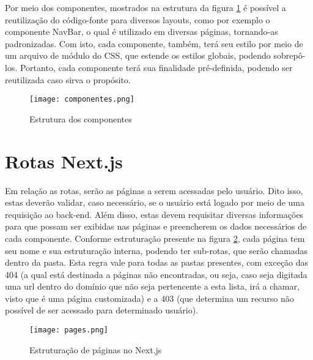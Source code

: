Por meio dos componentes, mostrados na estrutura da figura \ref{componentes} é possível a reutilização do código-fonte para diversos layouts, como por exemplo o componente NavBar, o qual é utilizado em diversas páginas, tornando-as padronizadas. Com isto, cada componente, também, terá seu estilo por meio de um arquivo de módulo do CSS, que estende os estilos globais, podendo sobrepô-los. Portanto, cada componente terá sua finalidade pré-definida, podendo ser reutilizada caso sirva o propósito.
\begin{figure}[H]
    \caption{\label{componentes}Estrutura dos componentes}
    \vspace{5pt}
    \centering
    \texttt{[image: componentes.png]}
    \vspace{5pt}
\end{figure}


\section{Rotas Next.js}
Em relação as rotas, serão as páginas a serem acessadas pelo usuário. Dito isso, estas deverão validar, caso necessário, se o usuário está logado por meio de uma requisição ao back-end. Além disso, estas devem requisitar diversas informações para que possam ser exibidas nas páginas e preencherem os dados necessários de cada componente. Conforme estruturação presente na figura \ref{pages}, cada página tem seu nome e sua estruturação interna, podendo ter sub-rotas, que serão chamadas dentro da pasta. Esta regra vale para todas as pastas presentes, com exceção das 404 (a qual está destinada a páginas não encontradas, ou seja, caso seja digitada uma url dentro do domínio que não seja pertencente a esta lista, irá a chamar, visto que é uma página customizada) e a 403 (que determina um recurso não possível de ser acessado para determinado usuário).
\begin{figure}[h]
    \caption{\label{pages}Estruturação de páginas no Next.js}
    \vspace{5pt}
    \centering
    \texttt{[image: pages.png]}
    \vspace{5pt}
\end{figure}

